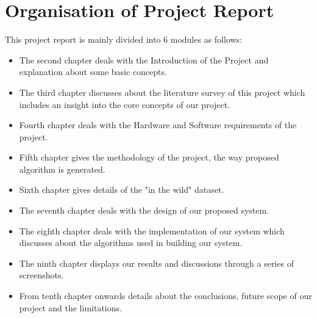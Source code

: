 \section{Organisation of Project Report}
This project report is mainly divided into 6 modules as follows:
\begin{itemize}
  \item The second chapter deals with the Introduction of the Project and explanation about some basic concepts.
  \item The third chapter discusses about the literature survey of this project which includes an insight into the core concepts of our project.
  \item Fourth chapter deals with the Hardware and Software requirements of the project.
  \item Fifth chapter gives the methodology of the project, the way proposed algorithm is generated.
  \item Sixth chapter gives details of the "in the wild" dataset.
  \item The seventh chapter deals with the design of our proposed system. 
  \item The eighth chapter deals with the implementation of our system which discusses about the algorithms used in building our system.
  \item The ninth chapter displays our results and discussions through a series of screenshots. 
  \item From tenth chapter onwards details about the conclusions, future scope of our project and the limitations. 
\end{itemize}


